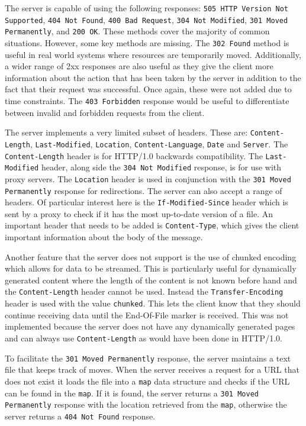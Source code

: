 \documentclass[10pt,twocolumn]{witseiepaper}
\begin{document}
	The server is capable of using the following responses: \texttt{505 HTTP Version Not Supported}, \texttt{404 Not Found}, \texttt{400 Bad Request}, \texttt{304 Not Modified}, \texttt{301 Moved Permanently}, and \texttt{200 OK}. These methods cover the majority of common situations. However, some key methods are missing. The \texttt{302 Found} method is useful in real world systems where resources are temporarily moved. Additionally, a wider range of 2xx responses are also useful as they give the client more information about the action that has been taken by the server in addition to the fact that their request was successful. Once again, these were not added due to time constraints. The \texttt{403 Forbidden} response would be useful to differentiate between invalid and forbidden requests from the client.

	The server implements a very limited subset of headers. These are: \texttt{Content-Length}, \texttt{Last-Modified}, \texttt{Location}, \texttt{Content-Language}, \texttt{Date} and \texttt{Server}. The \texttt{Content-Length} header is for HTTP/1.0 backwards compatibility. The \texttt{Last-Modified} header, along side the \texttt{304 Not Modified} response, is for use with proxy servers. The \texttt{Location} header is used in conjunction with the \texttt{301 Moved Permanently} response for redirections. The server can also accept a range of headers. Of particular interest here is the \texttt{If-Modified-Since} header which is sent by a proxy to check if it has the most up-to-date version of a file. An important header that needs to be added is \texttt{Content-Type}, which gives the client important information about the body of the message. 

	Another feature that the server does not support is the use of chunked encoding which allows for data to be streamed. This is particularly useful for dynamically generated content where the length of the content is not known before hand and the \texttt{Content-Length} header cannot be used. Instead the \texttt{Transfer-Encoding} header is used with the value \texttt{chunked}. This lets the client know that they should continue receiving data until the End-Of-File marker is received. This was not implemented because the server does not have any dynamically generated pages and can always use \texttt{Content-Length} as would have been done in HTTP/1.0.

	To facilitate the \texttt{301 Moved Permanently} response, the server maintains a text file that keeps track of moves. When the server receives a request for a URL that does not exist it loads the file into a \texttt{map} data structure and checks if the URL can be found in the \texttt{map}. If it is found, the server returns a \texttt{301 Moved Permanently} response with the location retrieved from the \texttt{map}, otherwise the server returns a \texttt{404 Not Found} response.	
\end{document}

